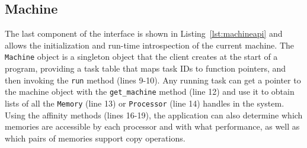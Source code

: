 




\subsection{Machine}
\label{subsec:machmodel}
The last component of the interface is shown in Listing~\ref{lst:machineapi} and allows the
initialization and run-time introspection
of the current machine.
The {\tt Machine} object is a singleton object that the client creates at the start of a
program, providing a task table that maps task IDs to function pointers,
and then invoking the {\tt run} method (lines 9-10).
Any running task can get a pointer to the machine object with the
{\tt get\_machine} method (line 12) and use it to obtain lists of all the {\tt Memory} (line 13) or 
{\tt Processor} (line 14) handles in the system.  Using the affinity methods (lines 16-19),
the application can also determine which memories are accessible by each
processor and with what performance, as well as which pairs of memories support copy operations.

